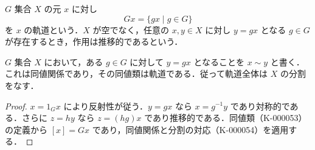\begin{defn}[軌道と推移的作用]
$G$ 集合 $X$ の元 $x$ に対し
\[
Gx=\{gx\mid g\in G\}
\]
を $x$ の軌道という．$X$ が空でなく，任意の $x,y\in X$ に対し $y=gx$ となる $g\in G$ が存在するとき，作用は推移的であるという．
\end{defn}
\begin{prop}[軌道による分割]
$G$ 集合 $X$ において，ある $g\in G$ に対して $y=gx$ となることを $x\sim y$ と書く．これは同値関係であり，その同値類は軌道である．従って軌道全体は $X$ の分割をなす．
\end{prop}
\begin{proof}
$x=1_Gx$ により反射性が従う．$y=gx$ なら $x=g^{-1}y$ であり対称的である．さらに $z=hy$ なら $z=(hg)x$ であり推移的である．同値類（K-000053）の定義から $[x]=Gx$ であり，同値関係と分割の対応（K-000054）を適用する．
\end{proof}

